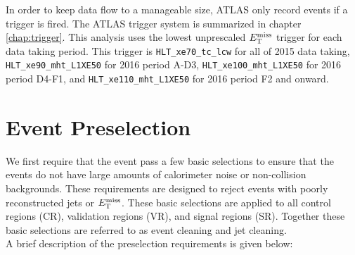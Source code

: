 \indent In order to keep data flow to a manageable size, ATLAS only record events if a trigger is fired.  The ATLAS trigger system is summarized in chapter \ref{chap:trigger}.  This analysis uses the lowest unprescaled $E_{\mathrm{T}}^{\mathrm{miss}}$ trigger for each data taking period.  This trigger is {\tt HLT\_xe70\_tc\_lcw} for all of 2015 data taking, \verb+HLT_xe90_mht_L1XE50+ for 2016 period A-D3, \verb+HLT_xe100_mht_L1XE50+ for 2016 period D4-F1, and \verb+HLT_xe110_mht_L1XE50+ for 2016 period F2 and onward. \\

\chapter{Event Preselection}
\label{sec:Selection_EventPreselection}

\indent We first require that the event pass a few basic selections to ensure that the events do not have large amounts of calorimeter noise or non-collision backgrounds.  These requirements are designed to reject events with poorly reconstructed jets or $E_{\mathrm{T}}^{\mathrm{miss}}$.  These basic selections are applied to all control regions (CR), validation regions (VR), and signal regions (SR).  Together these basic selections are referred to as event cleaning and jet cleaning.  \\

\indent A brief description of the preselection requirements is given below: \\

